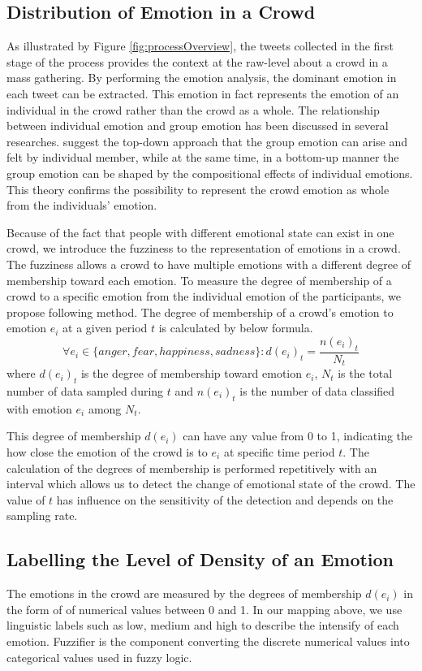 \subsection{Distribution of Emotion in a Crowd}

As illustrated by Figure \ref{fig:processOverview}, the tweets collected in the first stage of the process provides the context at the raw-level about a crowd in a mass gathering. By performing the emotion analysis, the dominant emotion in each tweet can be extracted. This emotion in fact represents the emotion of an individual in the crowd rather than the crowd as a whole. The relationship between individual emotion and group emotion has been discussed in several researches. \citet{barsade1998group} suggest the top-down approach that the group emotion can arise and felt by individual member, while at the same time, in a bottom-up manner the group emotion can be shaped by the compositional effects of individual emotions. This theory confirms the possibility to represent the crowd emotion as whole from the individuals' emotion.

Because of the fact that people with different emotional state can exist in one crowd, we introduce the fuzziness to the representation of emotions in a crowd. The fuzziness allows a crowd to have multiple emotions with a different degree of membership toward each emotion. To measure the degree of membership of a crowd to a specific emotion from the individual emotion of the participants, we propose following method. The degree of membership of a crowd's emotion to emotion \(e_i\) at a given period \(t\) is calculated by below formula.
\[
	\forall e_i \in \{anger, fear, happiness, sadness\}: d(e_i)_t = \frac{n(e_i)_t}{N_t}
\]
where \(d(e_i)_t\) is the degree of membership toward emotion \(e_i\), \(N_t\) is the total number of data sampled during \(t\) and \(n(e_i)_t\) is the number of data classified with emotion \(e_i\) among \(N_t\).

This degree of membership \(d(e_i)\) can have any value from 0 to 1, indicating the how close the emotion of the crowd is to \(e_i\) at specific time period \(t\). The calculation of the degrees of membership is performed repetitively with an interval which allows us to detect the change of emotional state of the crowd. The value of \(t\) has influence on the sensitivity of the detection and depends on the sampling rate.

\subsection{Labelling the Level of Density of an Emotion}
The emotions in the crowd are measured by the degrees of membership \(d(e_i)\) in the form of of numerical values between 0 and 1. In our mapping above, we use linguistic labels such as low, medium and high to describe the intensify of each emotion. Fuzzifier is the component converting the discrete numerical values into categorical values used in fuzzy logic. 

